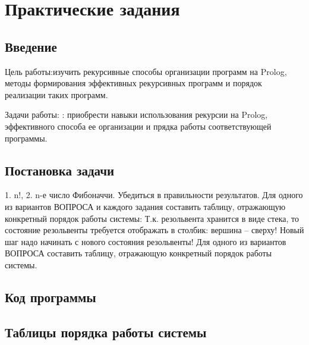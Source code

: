 \documentclass[a4paper, 14pt, unknownkeysallowed]{extreport}
\begin{document}

\setcounter{page}{2}

\chapter{Практические задания}


\section*{Введение}
Цель работы:изучить рекурсивные способы организации программ на Prolog,
методы формирования эффективных рекурсивных программ и порядок реализации
таких программ.

Задачи работы: : приобрести навыки использования рекурсии на Prolog, эффективного
способа ее организации и прядка работы соответствующей программы.

\section*{Постановка задачи}
1. n!,
2. n-е число Фибоначчи.
Убедиться в правильности результатов.
Для одного из вариантов ВОПРОСА и каждого задания составить таблицу, отражающую
конкретный порядок работы системы:
Т.к. резольвента хранится в виде стека, то состояние резольвенты требуется отображать в
столбик: вершина – сверху! Новый шаг надо начинать с нового состояния резольвенты!
Для одного из вариантов ВОПРОСА составить
таблицу, отражающую конкретный порядок работы системы.

\clearpage
\section{Код программы}
\section{Таблицы порядка работы системы}


\end{document}
